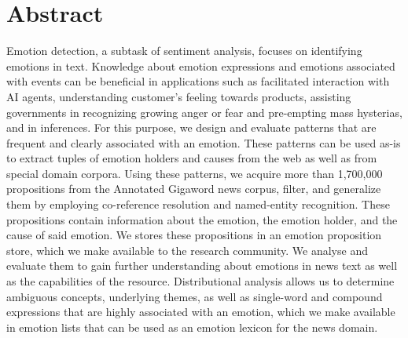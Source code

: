 

\begingroup
\let\clearpage\relax
\let\cleardoublepage\relax
\let\cleardoublepage\relax

\chapter*{Abstract} %

Emotion detection, a subtask of sentiment analysis, focuses on identifying emotions in text. Knowledge about emotion expressions and emotions associated with events can be beneficial in applications such as facilitated interaction with AI agents, understanding customer's feeling towards products, assisting governments in recognizing growing anger or fear and pre-empting mass hysterias, and in inferences. For this purpose, we design and evaluate patterns that are frequent and clearly associated with an emotion. These patterns can be used as-is to extract tuples of emotion holders and causes from the web as well as from special domain corpora. Using these patterns, we acquire more than 1,700,000 propositions from the Annotated Gigaword news corpus, filter, and generalize them by employing co-reference resolution and named-entity recognition. These propositions contain information about the emotion, the emotion holder, and the cause of said emotion. We stores these propositions in an emotion proposition store, which we make available to the research community. We analyse and evaluate them to gain further understanding about emotions in news text as well as the capabilities of the resource. Distributional analysis allows us to determine ambiguous concepts, underlying themes, as well as single-word and compound expressions that are highly associated with an emotion, which we make available in emotion lists that can be used as an emotion lexicon for the news domain.

\endgroup			

\vfill
